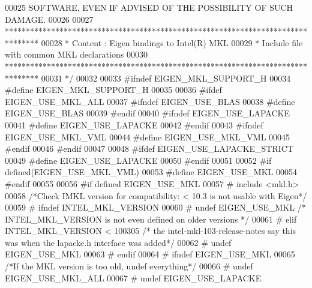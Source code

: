 \begin{DoxyCode}
00025 \textcolor{comment}{ SOFTWARE, EVEN IF ADVISED OF THE POSSIBILITY OF SUCH DAMAGE.}
00026 \textcolor{comment}{}
00027 \textcolor{comment}{ ********************************************************************************}
00028 \textcolor{comment}{ *   Content : Eigen bindings to Intel(R) MKL}
00029 \textcolor{comment}{ *   Include file with common MKL declarations}
00030 \textcolor{comment}{ ********************************************************************************}
00031 \textcolor{comment}{*/}
00032 
00033 \textcolor{preprocessor}{#ifndef EIGEN\_MKL\_SUPPORT\_H}
00034 \textcolor{preprocessor}{#define EIGEN\_MKL\_SUPPORT\_H}
00035 
00036 \textcolor{preprocessor}{#ifdef EIGEN\_USE\_MKL\_ALL}
00037 \textcolor{preprocessor}{  #ifndef EIGEN\_USE\_BLAS}
00038 \textcolor{preprocessor}{    #define EIGEN\_USE\_BLAS}
00039 \textcolor{preprocessor}{  #endif}
00040 \textcolor{preprocessor}{  #ifndef EIGEN\_USE\_LAPACKE}
00041 \textcolor{preprocessor}{    #define EIGEN\_USE\_LAPACKE}
00042 \textcolor{preprocessor}{  #endif}
00043 \textcolor{preprocessor}{  #ifndef EIGEN\_USE\_MKL\_VML}
00044 \textcolor{preprocessor}{    #define EIGEN\_USE\_MKL\_VML}
00045 \textcolor{preprocessor}{  #endif}
00046 \textcolor{preprocessor}{#endif}
00047 
00048 \textcolor{preprocessor}{#ifdef EIGEN\_USE\_LAPACKE\_STRICT}
00049 \textcolor{preprocessor}{  #define EIGEN\_USE\_LAPACKE}
00050 \textcolor{preprocessor}{#endif}
00051 
00052 \textcolor{preprocessor}{#if defined(EIGEN\_USE\_MKL\_VML)}
00053 \textcolor{preprocessor}{  #define EIGEN\_USE\_MKL}
00054 \textcolor{preprocessor}{#endif}
00055 
00056 \textcolor{preprocessor}{#if defined EIGEN\_USE\_MKL}
00057 \textcolor{preprocessor}{#   include <mkl.h>} 
00058 \textcolor{comment}{/*Check IMKL version for compatibility: < 10.3 is not usable with Eigen*/}
00059 \textcolor{preprocessor}{#   ifndef INTEL\_MKL\_VERSION}
00060 \textcolor{preprocessor}{#       undef EIGEN\_USE\_MKL }\textcolor{comment}{/* INTEL\_MKL\_VERSION is not even defined on older versions */}\textcolor{preprocessor}{}
00061 \textcolor{preprocessor}{#   elif INTEL\_MKL\_VERSION < 100305    }\textcolor{comment}{/* the intel-mkl-103-release-notes say this was when the lapacke.h
       interface was added*/}\textcolor{preprocessor}{}
00062 \textcolor{preprocessor}{#       undef EIGEN\_USE\_MKL}
00063 \textcolor{preprocessor}{#   endif}
00064 \textcolor{preprocessor}{#   ifndef EIGEN\_USE\_MKL}
00065     \textcolor{comment}{/*If the MKL version is too old, undef everything*/}
00066 \textcolor{preprocessor}{#       undef   EIGEN\_USE\_MKL\_ALL}
00067 \textcolor{preprocessor}{#       undef   EIGEN\_USE\_LAPACKE}

\end{DoxyCode}
